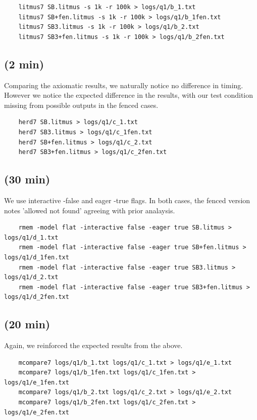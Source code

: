\begin{lstlisting}
    litmus7 SB.litmus -s 1k -r 100k > logs/q1/b_1.txt 
    litmus7 SB+fen.litmus -s 1k -r 100k > logs/q1/b_1fen.txt     
    litmus7 SB3.litmus -s 1k -r 100k > logs/q1/b_2.txt 
    litmus7 SB3+fen.litmus -s 1k -r 100k > logs/q1/b_2fen.txt 
\end{lstlisting}


\subsection{(2 min)}

Comparing the axiomatic results, we naturally notice no difference in timing. 
However we notice the expected difference in the results, with our test condition missing from possible outputs in the fenced cases. 

\begin{lstlisting}
    herd7 SB.litmus > logs/q1/c_1.txt 
    herd7 SB3.litmus > logs/q1/c_1fen.txt  
    herd7 SB+fen.litmus > logs/q1/c_2.txt
    herd7 SB3+fen.litmus > logs/q1/c_2fen.txt
\end{lstlisting}

\subsection{(30 min)}
We use interactive -false and eager -true flags. 
In both cases, the fenced version notes 'allowed not found'  agreeing with prior analaysis. 
\begin{lstlisting}    
    rmem -model flat -interactive false -eager true SB.litmus > logs/q1/d_1.txt
    rmem -model flat -interactive false -eager true SB+fen.litmus > logs/q1/d_1fen.txt
    rmem -model flat -interactive false -eager true SB3.litmus > logs/q1/d_2.txt      
    rmem -model flat -interactive false -eager true SB3+fen.litmus > logs/q1/d_2fen.txt
\end{lstlisting}

\subsection{(20 min)}
Again, we reinforced the expected results from the above. 
\begin{lstlisting}
    mcompare7 logs/q1/b_1.txt logs/q1/c_1.txt > logs/q1/e_1.txt
    mcompare7 logs/q1/b_1fen.txt logs/q1/c_1fen.txt > logs/q1/e_1fen.txt
    mcompare7 logs/q1/b_2.txt logs/q1/c_2.txt > logs/q1/e_2.txt
    mcompare7 logs/q1/b_2fen.txt logs/q1/c_2fen.txt > logs/q1/e_2fen.txt
    
\end{lstlisting}


